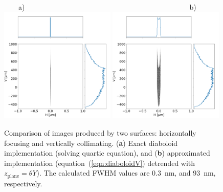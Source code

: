 \documentclass[preprint]{iucr}       %
\begin{document}
\begin{figure}
\label{fig:pointToSegment}
\flushleft
~~~~a)~~~~~~~~~~~~~~~~~~~~~~~~~~~~~~~~~~~~~~~~~~~~~~b)\\
\centering
\includegraphics[width=0.49\textwidth]{figures/p2s_V_z.png}
\includegraphics[width=0.49\textwidth]{figures/p2s_K_z.png} \\
\flushleft
\caption{Comparison of images produced by two surfaces: horizontally focusing and vertically collimating. (\textbf{a}) Exact diaboloid implementation (solving quartic equation), and (\textbf{b}) approximated implementation (equation~(\ref{eqn:diaboloidV}) detrended with $z_\mathrm{plane}=\theta Y$). The calculated FWHM values are \SI{0.3}{\nano\meter}, and \SI{93}{\nano\meter}, respectively.}
\end{figure}
\end{document}
